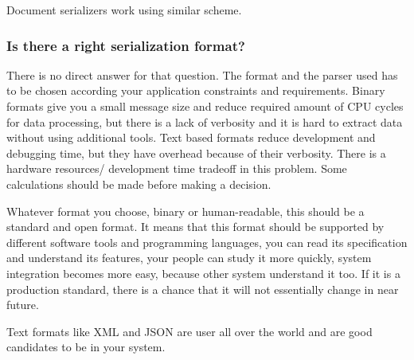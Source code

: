 Document serializers work using similar scheme.

\subsubsection{Is there a right serialization format?}

There is no direct answer for that question.
The format and the parser used has to be chosen according your application
constraints and requirements. Binary formats give you a small message size and
reduce required amount of CPU cycles for data processing, but there is a lack of
verbosity and it is hard to extract data without using additional tools. Text
based formats reduce development and debugging time, but they have overhead
because of their verbosity. There is a hardware resources/ development
time tradeoff in this problem. Some calculations should be made before making a
decision.

Whatever format you choose, binary or human-readable, this should be  a
standard and open format.
It means that this format should be supported by different software tools and programming
languages,  you can read its specification and understand its features, your
people can study it more quickly, system integration becomes more easy, because
other system understand it too. If it is a production standard, there is a
chance that it will not essentially change in near future.

Text formats like XML and JSON are user all over the world and are good
candidates to be in your system.




